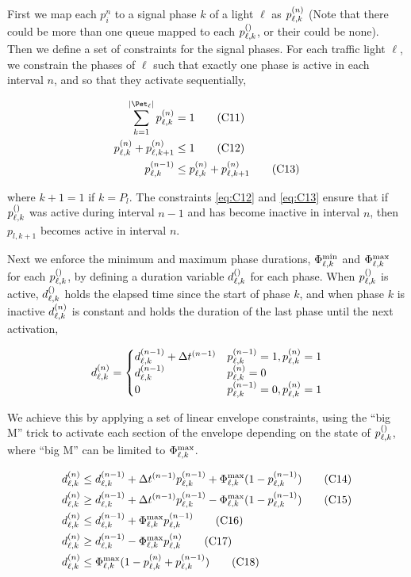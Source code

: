First we map each $p_i^n$ to a signal phase $k$ of a light $\ell$ as
$\p{\ell}{k}$ (Note that there could be more than one queue mapped to each
$\p[]{\ell}{k}$, or their could be none). Then we define a set of constraints
for the signal phases. For each traffic light $\ell$, we constrain the phases of
$\ell$ such that exactly one phase is active in each interval $n$, and so that
they activate sequentially,

\begin{align}
\sum\limits_{k=1}^{\Pn} \p{\ell}{k} &= 1\tag{C11}\label{eq:C11}\\
\p{\ell}{k} + \p{\ell}{k+1} &\le 1\tag{C12}\label{eq:C12}\\
\p[n-1]{\ell}{k} &\le \p{\ell}{k} + \p{\ell}{k+1}\tag{C13}\label{eq:C13}
\end{align}

where $k+1=1$ if $k=P_l$. The constraints \ref{eq:C12} and \ref{eq:C13} ensure
that if $\p[]{\ell}{k}$ was active during interval $n-1$ and has become inactive
in interval $n$, then $p_{l,k+1}$ becomes active in interval $n$.

Next we enforce the minimum and maximum phase durations, $\PTMIN{\ell}{k}$ and
$\PTMAX{\ell}{k}$ for each $\p[]{\ell}{k}$, by defining a duration variable
$\pd[]{\ell}{k}$ for each phase. When $\p[]{\ell}{k}$ is active,
$\pd[]{\ell}{k}$ holds the elapsed time since the start of phase $k$, and when
phase $k$ is inactive $\pd{\ell}{k}$ is constant and holds the duration of the
last phase until the next activation,

\begin{equation}
\pd{\ell}{k} = 
\begin{cases}
\pd[n-1]{\ell}{k} + \DT[n-1] & \p[n-1]{\ell}{k}=1,\p{\ell}{k}=1\\
\pd[n-1]{\ell}{k} & \p{\ell}{k}=0\\
0 & \p[n-1]{\ell}{k}=0,\p{\ell}{k}=1
\end{cases}
\end{equation}

We achieve this by applying a set of linear envelope constraints, using the
``big M'' trick to activate each section of the envelope depending on the state
of $\p[]{\ell}{k}$, where ``big M'' can be limited to $\PTMAX{\ell}{k}$.

\begin{align}
\pd{\ell}{k} &\le \pd[n-1]{\ell}{k} + \DT[n-1] \p[n-1]{\ell}{k} + \PTMAX{\ell}{k} (1 - \p[n-1]{\ell}{k})\tag{C14}\label{eq:C14}\\
\pd{\ell}{k} &\ge \pd[n-1]{\ell}{k} + \DT[n-1] \p[n-1]{\ell}{k} - \PTMAX{\ell}{k} (1 - \p[n-1]{\ell}{k})\tag{C15}\label{eq:C15}\\
\pd{\ell}{k} &\le \pd[n-1]{\ell}{k} + \PTMAX{\ell}{k} \p[n-1]{\ell}{k}\tag{C16}\label{eq:C16}\\
\pd{\ell}{k} &\ge \pd[n-1]{\ell}{k} - \PTMAX{\ell}{k} \p{\ell}{k}\tag{C17}\label{eq:C17}\\
\pd{\ell}{k} &\le \PTMAX{\ell}{k}(1 - \p{\ell}{k} + \p[n-1]{\ell}{k})\tag{C18}\label{eq:C18}
\end{align}


